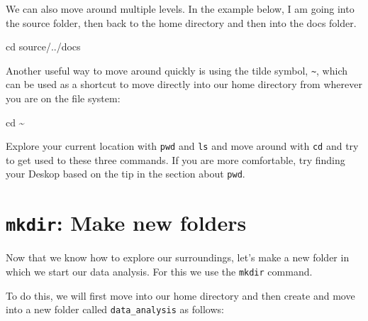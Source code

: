 \documentclass[
  letterpaper,
  DIV=11,
  numbers=noendperiod]{scrreprt}
\newenvironment{Shaded}{}{}
\newcommand{\BuiltInTok}[1]{\textcolor[rgb]{0.84,0.23,0.29}{#1}}
\newcommand{\NormalTok}[1]{\textcolor[rgb]{0.14,0.16,0.18}{#1}}
\begin{document}
We can also move around multiple levels. In the example below, I am
going into the source folder, then back to the home directory and then
into the docs folder.

\begin{Shaded}
\begin{Highlighting}[]
\BuiltInTok{cd}\NormalTok{ source/../docs}
\end{Highlighting}
\end{Shaded}

Another useful way to move around quickly is using the tilde symbol,
\texttt{\textasciitilde{}}, which can be used as a shortcut to move
directly into our home directory from wherever you are on the file
system:

\begin{Shaded}
\begin{Highlighting}[]
\BuiltInTok{cd}\NormalTok{ \textasciitilde{}}
\end{Highlighting}
\end{Shaded}

\begin{tcolorbox}[enhanced jigsaw, title=\textcolor{quarto-callout-caution-color}{\faFire}\hspace{0.5em}{Exercise}, colframe=quarto-callout-caution-color-frame, opacitybacktitle=0.6, rightrule=.15mm, arc=.35mm, left=2mm, colbacktitle=quarto-callout-caution-color!10!white, bottomrule=.15mm, leftrule=.75mm, toprule=.15mm, opacityback=0, bottomtitle=1mm, colback=white, toptitle=1mm, breakable, titlerule=0mm, coltitle=black]

Explore your current location with \texttt{pwd} and \texttt{ls} and move
around with \texttt{cd} and try to get used to these three commands. If
you are more comfortable, try finding your Deskop based on the tip in
the section about \texttt{pwd}.

\end{tcolorbox}

\section{\texorpdfstring{\texttt{mkdir}: Make new
folders}{mkdir: Make new folders}}\label{mkdir-make-new-folders}

Now that we know how to explore our surroundings, let's make a new
folder in which we start our data analysis. For this we use the
\texttt{mkdir} command.

To do this, we will first move into our home directory and then create
and move into a new folder called \texttt{data\_analysis} as follows:
\end{document}
